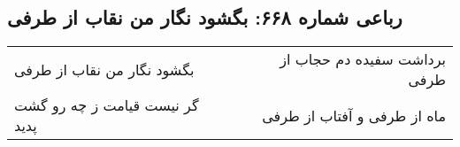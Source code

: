 \begin{center}
\section*{رباعی شماره ۶۶۸: بگشود نگار من نقاب از طرفی}
\label{sec:sh668}
\begin{longtable}{l p{0.5cm} r}
بگشود نگار من نقاب از طرفی
&&
برداشت سفیده دم حجاب از طرفی
\\
گر نیست قیامت ز چه رو گشت پدید
&&
ماه از طرفی و آفتاب از طرفی
\\
\end{longtable}
\end{center}
